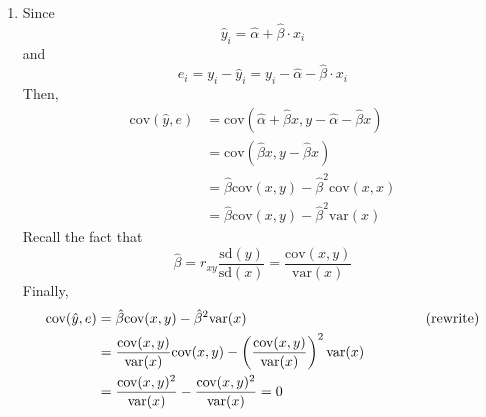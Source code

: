\documentclass{article}
\begin{document}
\begin{enumerate}
\begin{enumerate}
        \item Since
        \[\hat{y}_i=\hat{\alpha}+\hat{\beta}\cdot x_i\]
        and
        \[e_i=y_i-\hat{y}_i=y_i-\hat{\alpha}-\hat{\beta}\cdot x_i\]
        Then,
        \begin{align*}
            \text{cov}(\hat{y},e) &= \text{cov}(\hat{\alpha}+\hat{\beta}x,y-\hat{\alpha}-\hat{\beta}x)\\
            &= \text{cov}(\hat{\beta}x,y-\hat{\beta} x)\\
            &= \hat{\beta}\text{cov}(x,y)-\hat{\beta}^2\text{cov}(x,x)\\
            &= \hat{\beta}\text{cov}(x,y)-\hat{\beta}^2\text{var}(x)
        \end{align*}
        Recall the fact that
        \[\hat{\beta}=r_{xy}\frac{\text{sd}(y)}{\text{sd}(x)}=\frac{\text{cov}(x,y)}{\text{var}(x)}\]
        Finally,
        \begin{align*}
            \text{cov}(\hat{y},e) &= \hat{\beta}\text{cov}(x,y)-\hat{\beta}^2\text{var}(x) \hspace{4.5 cm} \text{(rewrite)}\\
            &= \frac{\text{cov}(x,y)}{\text{var}(x)}\text{cov}(x,y)-\left(\frac{\text{cov}(x,y)}{\text{var}(x)}\right)^2\text{var}(x)\\
            &= \frac{\text{cov}(x,y)^2}{\text{var}(x)}-\frac{\text{cov}(x,y)^2}{\text{var}(x)}=0
        \end{align*}
    \end{enumerate}
\end{enumerate}
\end{document}
